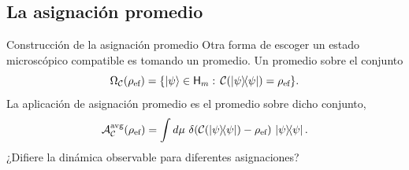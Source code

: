 \subsection{La asignación promedio}
\begin{frame}{Construcción de la asignación promedio}
    Otra forma de escoger un estado microscópico compatible \pause es tomando un promedio. \pause Un promedio sobre el conjunto \pause
    \begin{equation}
        \Omega_{\mcC}(\rho_{\ef}) = \{\ket{\psi}\in\hilbert_{m}:\, \mcC(\dyad{\psi}) = \rho_{\ef}  \}.\nonumber
    \end{equation}
    La aplicación de asignación promedio es el promedio sobre dicho conjunto, \ie \pause
    \begin{equation}
        \mcA_{\mcC}^{\avg}(\rho_{\ef}) =\int d \mu\,\, \delta(\mcC(\dyad{\psi})-\rho_{\ef})\,\dyad{\psi}.\nonumber
    \end{equation} \pause
    ¿Difiere la dinámica observable para diferentes asignaciones?
\end{frame}
